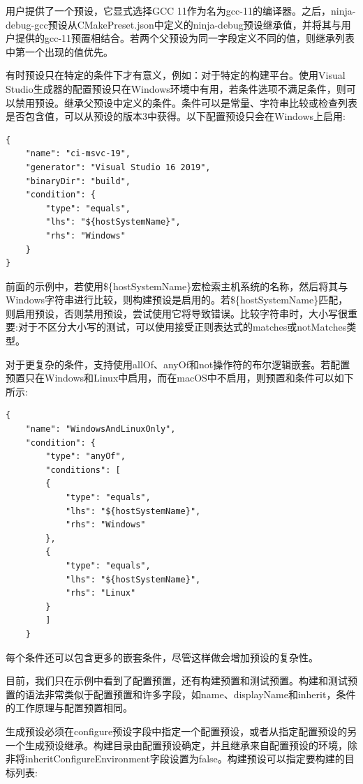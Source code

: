 用户提供了一个预设，它显式选择GCC 11作为名为gcc-11的编译器。之后，ninja-debug-gcc预设从CMakePreset.json中定义的ninja-debug预设继承值，并将其与用户提供的gcc-11预置相结合。若两个父预设为同一字段定义不同的值，则继承列表中第一个出现的值优先。


有时预设只在特定的条件下才有意义，例如：对于特定的构建平台。使用Visual Studio生成器的配置预设只在Windows环境中有用，若条件选项不满足条件，则可以禁用预设。继承父预设中定义的条件。条件可以是常量、字符串比较或检查列表是否包含值，可以从预设的版本3中获得。以下配置预设只会在Windows上启用:

\begin{lstlisting}[style=styleCMake]
{
	"name": "ci-msvc-19",
	"generator": "Visual Studio 16 2019",
	"binaryDir": "build",
	"condition": {
		"type": "equals",
		"lhs": "${hostSystemName}",
		"rhs": "Windows"
	}
}
\end{lstlisting}

前面的示例中，若使用\$\{hostSystemName\}宏检索主机系统的名称，然后将其与Windows字符串进行比较，则构建预设是启用的。若\$\{hostSystemName\}匹配，则启用预设，否则禁用预设，尝试使用它将导致错误。比较字符串时，大小写很重要:对于不区分大小写的测试，可以使用接受正则表达式的matches或notMatches类型。

对于更复杂的条件，支持使用allOf、anyOf和not操作符的布尔逻辑嵌套。若配置预置只在Windows和Linux中启用，而在macOS中不启用，则预置和条件可以如下所示:

\begin{lstlisting}[style=styleCMake]
{
	"name": "WindowsAndLinuxOnly",
	"condition": {
		"type": "anyOf",
		"conditions": [
		{
			"type": "equals",
			"lhs": "${hostSystemName}",
			"rhs": "Windows"
		},
		{
			"type": "equals",
			"lhs": "${hostSystemName}",
			"rhs": "Linux"
		}
		]
	}
\end{lstlisting}

每个条件还可以包含更多的嵌套条件，尽管这样做会增加预设的复杂性。

目前，我们只在示例中看到了配置预置，还有构建预置和测试预置。构建和测试预置的语法非常类似于配置预置和许多字段，如name、displayName和inherit，条件的工作原理与配置预置相同。

生成预设必须在configure预设字段中指定一个配置预设，或者从指定配置预设的另一个生成预设继承。构建目录由配置预设确定，并且继承来自配置预设的环境，除非将inheritConfigureEnvironment字段设置为false。构建预设可以指定要构建的目标列表:


